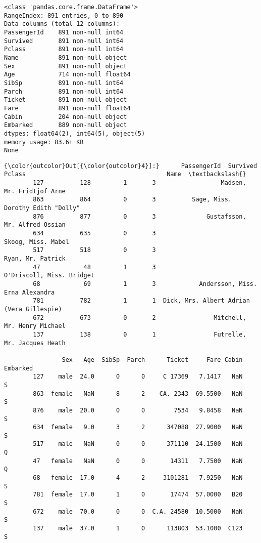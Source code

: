 \documentclass[11pt]{article}
\begin{document}
    \begin{Verbatim}[commandchars=\\\{\}]
<class 'pandas.core.frame.DataFrame'>
RangeIndex: 891 entries, 0 to 890
Data columns (total 12 columns):
PassengerId    891 non-null int64
Survived       891 non-null int64
Pclass         891 non-null int64
Name           891 non-null object
Sex            891 non-null object
Age            714 non-null float64
SibSp          891 non-null int64
Parch          891 non-null int64
Ticket         891 non-null object
Fare           891 non-null float64
Cabin          204 non-null object
Embarked       889 non-null object
dtypes: float64(2), int64(5), object(5)
memory usage: 83.6+ KB
None

    \end{Verbatim}

\begin{Verbatim}[commandchars=\\\{\}]
{\color{outcolor}Out[{\color{outcolor}4}]:}      PassengerId  Survived  Pclass                                       Name  \textbackslash{}
        127          128         1       3                  Madsen, Mr. Fridtjof Arne   
        863          864         0       3          Sage, Miss. Dorothy Edith "Dolly"   
        876          877         0       3              Gustafsson, Mr. Alfred Ossian   
        634          635         0       3                         Skoog, Miss. Mabel   
        517          518         0       3                          Ryan, Mr. Patrick   
        47            48         1       3                  O'Driscoll, Miss. Bridget   
        68            69         1       3            Andersson, Miss. Erna Alexandra   
        781          782         1       1  Dick, Mrs. Albert Adrian (Vera Gillespie)   
        672          673         0       2                Mitchell, Mr. Henry Michael   
        137          138         0       1                Futrelle, Mr. Jacques Heath   
        
                Sex   Age  SibSp  Parch      Ticket     Fare Cabin Embarked  
        127    male  24.0      0      0     C 17369   7.1417   NaN        S  
        863  female   NaN      8      2    CA. 2343  69.5500   NaN        S  
        876    male  20.0      0      0        7534   9.8458   NaN        S  
        634  female   9.0      3      2      347088  27.9000   NaN        S  
        517    male   NaN      0      0      371110  24.1500   NaN        Q  
        47   female   NaN      0      0       14311   7.7500   NaN        Q  
        68   female  17.0      4      2     3101281   7.9250   NaN        S  
        781  female  17.0      1      0       17474  57.0000   B20        S  
        672    male  70.0      0      0  C.A. 24580  10.5000   NaN        S  
        137    male  37.0      1      0      113803  53.1000  C123        S  
\end{Verbatim}
            
\end{document}
